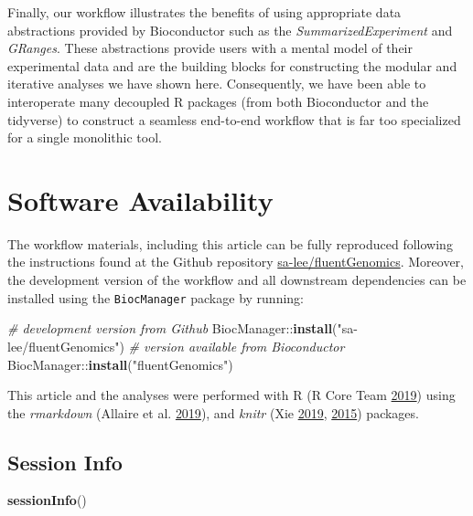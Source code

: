 \documentclass[
]{article}
\newenvironment{Shaded}{}{}
\newcommand{\CommentTok}[1]{\textcolor[rgb]{0.38,0.63,0.69}{\textit{#1}}}
\newcommand{\KeywordTok}[1]{\textcolor[rgb]{0.00,0.44,0.13}{\textbf{#1}}}
\newcommand{\NormalTok}[1]{#1}
\newcommand{\OperatorTok}[1]{\textcolor[rgb]{0.40,0.40,0.40}{#1}}
\newcommand{\StringTok}[1]{\textcolor[rgb]{0.25,0.44,0.63}{#1}}
\begin{document}
Finally, our workflow illustrates the benefits of using appropriate data
abstractions provided by Bioconductor such as the \emph{SummarizedExperiment} and
\emph{GRanges}. These abstractions provide users with a mental model of their
experimental data and are the building blocks for constructing the modular and
iterative analyses we have shown here. Consequently, we have been able to
interoperate many decoupled R packages (from both Bioconductor and the
tidyverse) to construct a seamless end-to-end workflow that is far too
specialized for a single monolithic tool.

\hypertarget{software-availability}{%
\section{Software Availability}\label{software-availability}}

The workflow materials, including this article can be fully reproduced
following the instructions found at the Github repository
\href{https://github.com/sa-lee/fluentGenomics}{sa-lee/fluentGenomics}. Moreover,
the development version of the workflow and all downstream dependencies can be
installed using the \texttt{BiocManager} package by running:

\begin{Shaded}
\begin{Highlighting}[]
\CommentTok{# development version from Github}
\NormalTok{BiocManager}\OperatorTok{::}\KeywordTok{install}\NormalTok{(}\StringTok{"sa-lee/fluentGenomics"}\NormalTok{)}
\CommentTok{# version available from Bioconductor}
\NormalTok{BiocManager}\OperatorTok{::}\KeywordTok{install}\NormalTok{(}\StringTok{"fluentGenomics"}\NormalTok{)}
\end{Highlighting}
\end{Shaded}

This article and the analyses were performed with R (R Core Team \protect\hyperlink{ref-baser}{2019}) using the
\emph{rmarkdown} (Allaire et al. \protect\hyperlink{ref-rmarkdown}{2019}), and \emph{knitr} (Xie \protect\hyperlink{ref-knitr}{2019}, \protect\hyperlink{ref-xie2015}{2015}) packages.

\hypertarget{session-info}{%
\subsection{Session Info}\label{session-info}}

\begin{Shaded}
\begin{Highlighting}[]
\KeywordTok{sessionInfo}\NormalTok{()}
\end{Highlighting}
\end{Shaded}
\end{document}
